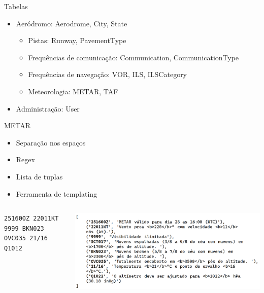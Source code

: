\documentclass{beamer}
\begin{document}
\begin{frame}{Tabelas}
    \begin{itemize}
        \item Aeródromo: Aerodrome, City, State
        \begin{itemize}
            \item \small{Pistas:} Runway, PavementType
            \pause
            \item Frequências de comunicação: Communication, CommunicationType
            \item Frequências de navegação: VOR, ILS, ILSCategory
            \pause
            \item Meteorologia: METAR, TAF
        \end{itemize}
    \end{itemize}
    \pause
    \begin{itemize}
        \item Administração: User
    \end{itemize}
\end{frame}

\begin{frame}{METAR}
    \centering
    \begin{itemize}
        \item Separação nos espaços
        \item Regex
        \item Lista de tuplas
        \item Ferramenta de templating
    \end{itemize}

    \begin{minipage}[b]{0.9\linewidth}
        \begin{columns}
            \begin{column}{0.4\textwidth}
                \tiny{\texttt{251600Z 22011KT 9999 BKN023 OVC035 21/16 Q1012}}
            \end{column}
            \begin{column}{0.6\textwidth}
                \includegraphics[width=\linewidth]{img/metar-dec.png}
            \end{column}
        \end{columns}
    \end{minipage}
\end{frame}
\end{document}
